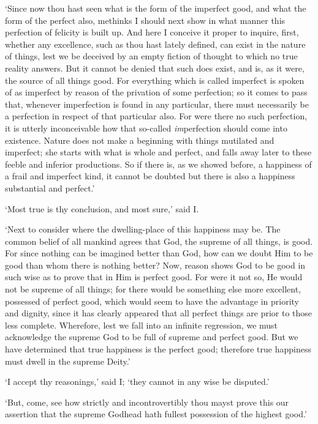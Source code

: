 \documentclass[12pt]{book}
\begin{document}
`Since now thou hast seen what is the form of the imperfect good, and
what the form of the perfect also, methinks I should next show in what
manner this perfection of felicity is built up. And here I conceive it
proper to inquire, first, whether any excellence, such as thou hast
lately defined, can exist in the nature of things, lest we be deceived
by an empty fiction of thought to which no true reality answers. But it
cannot be denied that such does exist, and is, as it were, the source of
all things good. For everything which is called imperfect is spoken of
as imperfect by reason of the privation of some perfection; so it comes
to pass that, whenever imperfection is found in any particular, there
must necessarily be a perfection in respect of that particular also. For
were there no such perfection, it is utterly inconceivable how that
so-called \emph{im}perfection should come into existence. Nature does not
make a beginning with things mutilated and imperfect; she starts with
what is whole and perfect, and falls away later to these feeble and
inferior productions. So if there is, as we showed before, a happiness
of a frail and imperfect kind, it cannot be doubted but there is also a
happiness substantial and perfect.'

`Most true is thy conclusion, and most sure,' said I.

`Next to consider where the dwelling-place of this happiness may be. The
common belief of all mankind agrees that God, the supreme of all things,
is good. For since nothing can be imagined better than God, how can we
doubt Him to be good than whom there is nothing better? Now, reason
shows God to be good in such wise as to prove that in Him is perfect
good. For were it not so, He would not be supreme of all things; for
there would be something else more excellent, possessed of perfect good,
which would seem to have the advantage in priority and dignity, since it
has clearly appeared that all perfect things are prior to those less
complete. Wherefore, lest we fall into an infinite regression, we must
acknowledge the supreme God to be full of supreme and perfect good. But
we have determined that true happiness is the perfect good; therefore
true happiness must dwell in the supreme Deity.'

`I accept thy reasonings,' said I; `they cannot in any wise be
disputed.'

`But, come, see how strictly and incontrovertibly thou mayst prove this
our assertion that the supreme Godhead hath fullest possession of the
highest good.'
\end{document}
